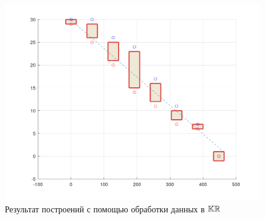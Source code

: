 \documentclass[a4paper]{article}
\begin{document}
\begin{figure}[H]
    \centering
    \includegraphics[width=15cm]{img/res_3.png}
    \caption{Результат построений с помощью обработки данных в $\mathbb{KR}$}
    \label{fig:res_3}
\end{figure}
\end{document}

